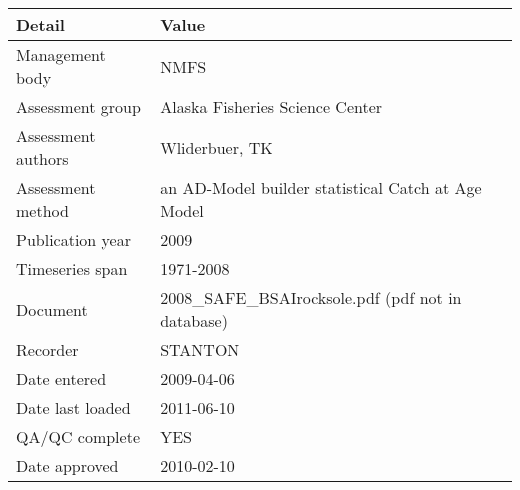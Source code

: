 \begin{table}[htb]
\centering
\begin{tabular}{lp{7cm}}
\toprule
Detail & Value \\
\midrule
Management body    & NMFS                                               \\
Assessment group   & Alaska Fisheries Science Center                    \\
Assessment authors & Wliderbuer, TK                                     \\
Assessment method  & an AD-Model builder statistical Catch at Age Model \\
Publication year   & 2009                                               \\
Timeseries span    & 1971-2008                                          \\
Document           & 2008\_SAFE\_BSAIrocksole.pdf (pdf not in database) \\
Recorder           & STANTON                                            \\
Date entered       & 2009-04-06                                         \\
Date last loaded   & 2011-06-10                                         \\
QA/QC complete     & YES                                                \\
Date approved      & 2010-02-10                                         \\
\bottomrule
\end{tabular}
\label{tab:assessdet}
\end{table}

